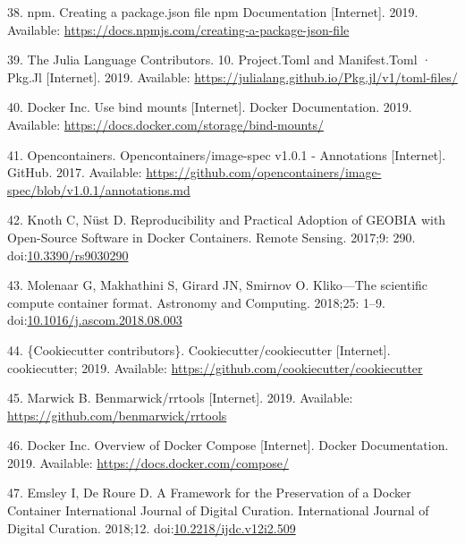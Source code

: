 \documentclass[10pt,letterpaper]{article}
\begin{document}
\leavevmode\hypertarget{ref-npm_creating_2019}{}%
38. npm. Creating a package.json file npm Documentation {[}Internet{]}.
2019. Available:
\url{https://docs.npmjs.com/creating-a-package-json-file}

\leavevmode\hypertarget{ref-julia_tomls_2019}{}%
39. The Julia Language Contributors. 10. Project.Toml and Manifest.Toml
· Pkg.Jl {[}Internet{]}. 2019. Available:
\url{https://julialang.github.io/Pkg.jl/v1/toml-files/}

\leavevmode\hypertarget{ref-docker_use_2019}{}%
40. Docker Inc. Use bind mounts {[}Internet{]}. Docker Documentation.
2019. Available: \url{https://docs.docker.com/storage/bind-mounts/}

\leavevmode\hypertarget{ref-opencontainers_image-spec_2017}{}%
41. Opencontainers. Opencontainers/image-spec v1.0.1 - Annotations
{[}Internet{]}. GitHub. 2017. Available:
\url{https://github.com/opencontainers/image-spec/blob/v1.0.1/annotations.md}

\leavevmode\hypertarget{ref-knoth_reproducibility_2017}{}%
42. Knoth C, Nüst D. Reproducibility and Practical Adoption of GEOBIA
with Open-Source Software in Docker Containers. Remote Sensing. 2017;9:
290. doi:\href{https://doi.org/10.3390/rs9030290}{10.3390/rs9030290}

\leavevmode\hypertarget{ref-molenaar_klikoscientific_2018}{}%
43. Molenaar G, Makhathini S, Girard JN, Smirnov O. Kliko---The
scientific compute container format. Astronomy and Computing. 2018;25:
1--9.
doi:\href{https://doi.org/10.1016/j.ascom.2018.08.003}{10.1016/j.ascom.2018.08.003}

\leavevmode\hypertarget{ref-cookiecutter_contributors_cookiecutter_2019}{}%
44. \{Cookiecutter contributors\}. Cookiecutter/cookiecutter
{[}Internet{]}. cookiecutter; 2019. Available:
\url{https://github.com/cookiecutter/cookiecutter}

\leavevmode\hypertarget{ref-marwick_rrtools_2019}{}%
45. Marwick B. Benmarwick/rrtools {[}Internet{]}. 2019. Available:
\url{https://github.com/benmarwick/rrtools}

\leavevmode\hypertarget{ref-docker-compose_2019}{}%
46. Docker Inc. Overview of Docker Compose {[}Internet{]}. Docker
Documentation. 2019. Available: \url{https://docs.docker.com/compose/}

\leavevmode\hypertarget{ref-emsley_framework_2018}{}%
47. Emsley I, De Roure D. A Framework for the Preservation of a Docker
Container International Journal of Digital Curation. International
Journal of Digital Curation. 2018;12.
doi:\href{https://doi.org/10.2218/ijdc.v12i2.509}{10.2218/ijdc.v12i2.509}
\end{document}
